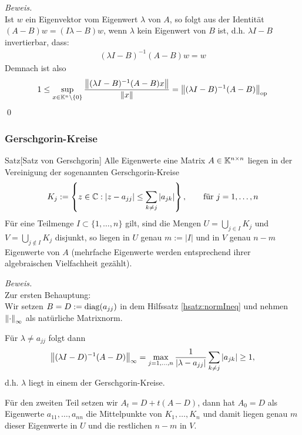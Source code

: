 \textit{Beweis.} \\
Ist $w$ ein Eigenvektor vom Eigenwert $\lambda$ von $A$, so folgt aus der Identität 
$(A-B)w = (I\lambda - B)w$, wenn $\lambda$ kein Eigenwert von $B$ ist, d.h. $\lambda I-B$ invertierbar, dass:
% 
\begin{align*}
  (\lambda I-B)^{-1}(A-B)w = w
\end{align*}
%
Demnach ist also 
%
\begin{align*}
  1\leq \sup_{x\in\K^n\backslash\{0\}} \dfrac{\vertn{2}{(\lambda I-B)^{-1}(A-B)x}}{\vertn{2}{x}}
  =\vertn{2}{(\lambda I-B)^{-1}(A-B)}_{\op}
\end{align*}
\qed
%
\subsubsection{Gerschgorin-Kreise}
%
\begin{colbox}{Satz}[Satz von Gerschgorin]\label{satz:gerschgorin}
  Alle Eigenwerte eine Matrix $A\in\mathbb K^{n\times n}$ liegen in der Vereinigung der sogenannten 
  Gerschgorin-Kreise
  \begin{align*}
    K_j := \left\{z\in\mathbb C : |z-a_{jj}|\leq \sum_{k\neq j} |a_{jk}|\right\},
    \qquad \text{für } j=1,\dots,n
  \end{align*}
  Für eine Teilmenge $I\subset\{1,\dots,n\}$ gilt, sind die Mengen $U=\displaystyle \bigcup_{j\in I} K_j$ 
  und $V=\displaystyle \bigcup_{j\notin I} K_j$ disjunkt, so liegen in $U$ genau $m:=|I|$ und in $V$ genau $n-m$ 
  Eigenwerte von $A$ (mehrfache Eigenwerte werden entsprechend ihrer algebraischen Vielfachheit gezählt).
\end{colbox}

\textit{Beweis.} \\
Zur ersten Behauptung: \\
Wir setzen $B=D:=\operatorname*{diag}(a_{jj})$ in dem Hilfssatz \ref{hsatz:normIneq} und nehmen 
$\vertn{2}{\cdot}_\infty$ als natürliche Matrixnorm. 

Für $\lambda\neq a_{jj}$ folgt dann 
%
\begin{align*}
  \vertn{2}{(\lambda I -D)^{-1}(A-D)}_\infty 
  = \max_{j=1,\dots,n}\dfrac{1}{|\lambda-a_{jj}|}\sum_{k\neq j} |a_{jk}|
  \geq 1,
\end{align*}
%
d.h. $\lambda$ liegt in einem der Gerschgorin-Kreise. 

Für den zweiten Teil setzen wir $A_t = D + t(A-D)$, 
dann hat $A_0 = D$ als Eigenwerte $a_{11},\dots,a_{nn}$ die Mittelpunkte von $K_1,\dots,K_n$ 
und damit liegen genau $m$ dieser Eigenwerte in $U$ und die restlichen $n-m$ in $V$. 

